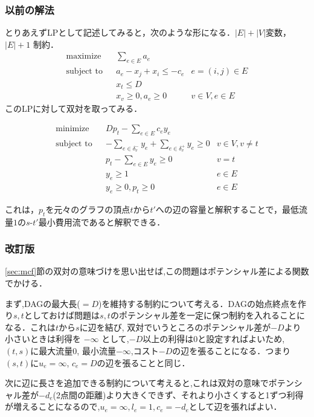 \documentclass[13pt]{jarticle}
\theoremstyle{nonitalic} %
\begin{document}
\subsubsection{以前の解法}
とりあえずLPとして記述してみると，次のような形になる．$|E|+|V|$変数， $|E|+1$ 制約．
\begin{align}
 &&&&&\textrm{maximize}   && \sum_{e \in E} a_e \\
 &&&&&\textrm{subject to} && a_e - x_j + x_i \leq - c_e & e = (i,j) \in E  &&&&&\\
 &&&&&                    && x_t \leq  D &&&&&& \\
 &&&&&                    && x_v \geq 0, a_e \geq 0 & v \in V, e \in E &&&&&
\end{align}
このLPに対して双対を取ってみる．

\begin{align}
  &&&&& \textrm{minimize}   && Dp_t - \sum_{e \in E} c_e y_e \\
  &&&&& \textrm{subject to} && -\sum_{e \in \delta_v^- } y_e + \sum_{e \in \delta_v^+ } y_e \geq 0 & v \in V, v\neq t &&&&&\\
  &&&&&                     && p_t - \sum_{e \in E} y_e \geq 0 & v=t \\
  &&&&&                     && y_e \geq 1  & e \in E\\
  &&&&&                     && y_e \geq 0, p_t \geq 0 & e\in E
\end{align}


これは，$p_t$を元々のグラフの頂点$t$から$t'$への辺の容量と解釈することで，最低流量$1$の$s$-$t'$最小費用流であると解釈できる．

\subsubsection{改訂版}
\ref{sec:mcf}節の双対の意味づけを思い出せば,この問題はポテンシャル差による関数でかける．

まず,DAGの最大長($=D$)を維持する制約について考える．DAGの始点終点を作り$s,t$としておけば問題は$s,t$のポテンシャル差を一定に保つ制約を入れることになる．これは$t$から$s$に辺を結び, 双対でいうところのポテンシャル差が$-D$より小さいときは利得を $-\infty$ として,$-D$以上の利得は0と設定すればよいため,
$(t,s)$に最大流量0, 最小流量$-\infty$,コスト$-D$の辺を張ることになる．つまり$(s,t)$に$u_e = \infty$, $c_e=D$の辺を張ることと同じ．

次に辺に長さを追加できる制約について考えると,これは双対の意味でポテンシャル差が$-d_e$(2点間の距離)より大きくできず、それより小さくすると1ずつ利得が増えることになるので,$u_e = \infty, l_e=1, c_e = -d_e $として辺を張ればよい．
\end{document}
